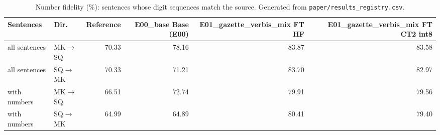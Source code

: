 \begin{table}[t]
\centering
\small
\begin{tabular}{llrrrr}
\toprule
Sentences & Dir. & Reference & E00\_base Base (E00) & E01\_gazette\_verbis\_mix FT HF & E01\_gazette\_verbis\_mix FT CT2 int8 \\
\midrule
all sentences & MK$\rightarrow$SQ & 70.33 & 78.16 & 83.87 & 83.58 \\
all sentences & SQ$\rightarrow$MK & 70.33 & 71.21 & 83.70 & 82.97 \\
with numbers & MK$\rightarrow$SQ & 66.51 & 72.74 & 79.91 & 79.56 \\
with numbers & SQ$\rightarrow$MK & 64.99 & 64.89 & 80.41 & 79.40 \\
\bottomrule
\end{tabular}
\caption{Number fidelity (\%): sentences whose digit sequences match the source. Generated from \texttt{paper/results\_registry.csv}.}
\label{tab:number-fidelity}
\end{table}
